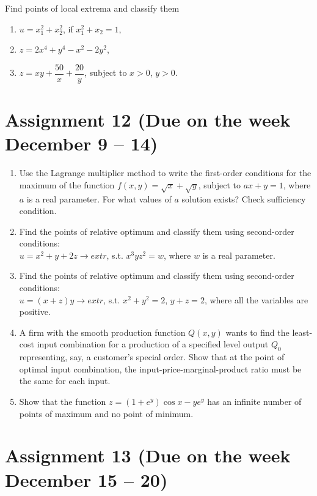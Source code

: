 \documentclass[12pt]{article} %
\theoremstyle{definition} %
\begin{document}
Find points of local extrema and classify them

\begin{enumerate}[resume]
\item $u=x_1^2+x_2^2$, if $x_1^2+x_2=1$,
\item $z=2x^4+y^4-x^2-2y^2$,
\item $z=xy+\dfrac{50}x+\dfrac{20}y$, subject to $x>0$, $y>0$.
\end{enumerate}




\section*{Assignment 12 (Due on the week December 9 – 14)}

\begin{enumerate}
\item Use the Lagrange multiplier method to write the first-order conditions 
for the maximum of the function $f(x,y)=\sqrt{x}+\sqrt{y}$, subject to $ax+y=1$, 
where $a$ is a real parameter. For what values of $a$ solution exists? Check sufficiency condition.

\item Find the points of relative optimum and classify them using second-order conditions:\\ 
$u=x^2+y+2z\rightarrow extr$, s.t. $x^3yz^2=w$, where $w$ is a real parameter.

\item Find the points of relative optimum and classify them using second-order conditions:\\ 
$u=(x+z)y\rightarrow extr$, s.t. $x^2+y^2=2$, $y+z=2$, where all the variables are positive.
    
\item A firm with the smooth production function $Q(x,y)$ wants to find the least-cost input combination 
for a production of a specified level output $Q_0$ representing, say, a customer's special order. 
Show that at the point of optimal input combination, 
the input-price-marginal-product ratio must be the same for each input.
\item Show that the function $z=(1+e^y)\cos x-y e^y$ 
has an infinite number of points of maximum and no point of minimum.
\end{enumerate}



\section*{Assignment 13 (Due on the week December 15 – 20)}
\end{document}
